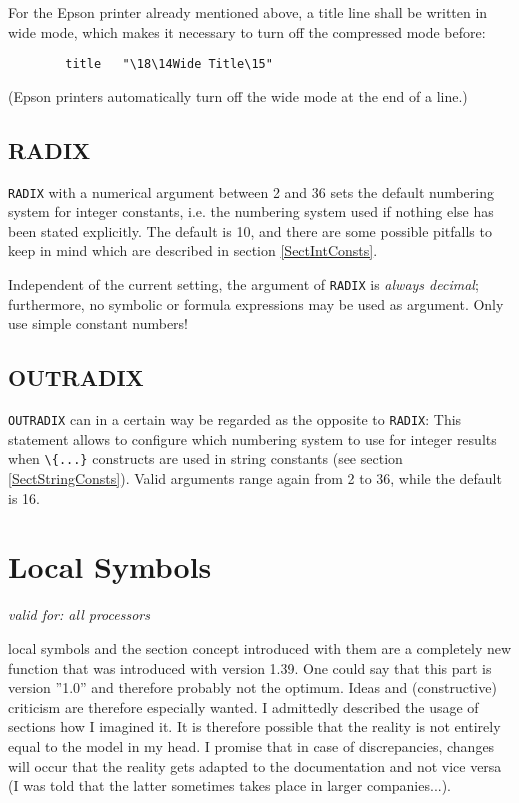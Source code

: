 \documentclass[12pt,twoside]{report}
\makeatletter
\newcommand{\tty}[1]{{\tt #1}}
\newcommand{\ttindex}[1]{\index{#1@{\tt #1}}}
\makeatother
\begin{document}
For the Epson printer already mentioned above, a title line shall be
written in wide mode, which makes it necessary to turn off the
compressed mode before:
\begin{verbatim}
        title   "\18\14Wide Title\15"
\end{verbatim}
(Epson printers automatically turn off the wide mode at the end of a
line.)


\subsection{RADIX}
\ttindex{RADIX}

\tty{RADIX} with a numerical argument between 2 and 36 sets the default
numbering system for integer constants, i.e. the numbering system used if
nothing else has been stated explicitly.  The default is 10, and there are
some possible pitfalls to keep in mind which are described in section
\ref{SectIntConsts}.

Independent of the current setting, the argument of {\tt RADIX} is {\em
always decimal}; furthermore, no symbolic or formula expressions may be
used as argument. Only use simple constant numbers!


\subsection{OUTRADIX}
\ttindex{OUTRADIX}

\tty{OUTRADIX} can in a certain way be regarded as the opposite to
\tty{RADIX}: This statement allows to configure which numbering system to
use for integer results when \verb!\{...}! constructs are used in string
constants (see section \ref{SectStringConsts}).  Valid arguments range
again from 2 to 36, while the default is 16.


\section{Local Symbols}
\label{ChapLocSyms}

{\em valid for: all processors}

local symbols and the section concept introduced with them are a
completely new function that was introduced with version 1.39.  One
could say that this part is version ''1.0'' and therefore probably not
the optimum.  Ideas and (constructive) criticism are therefore
especially wanted.  I admittedly described the usage of sections how
I imagined it.  It is therefore possible that the reality is not
entirely equal to the model in my head.  I promise that in case of
discrepancies, changes will occur that the reality gets adapted to
the documentation and not vice versa (I was told that the latter
sometimes takes place in larger companies...).
\end{document}
